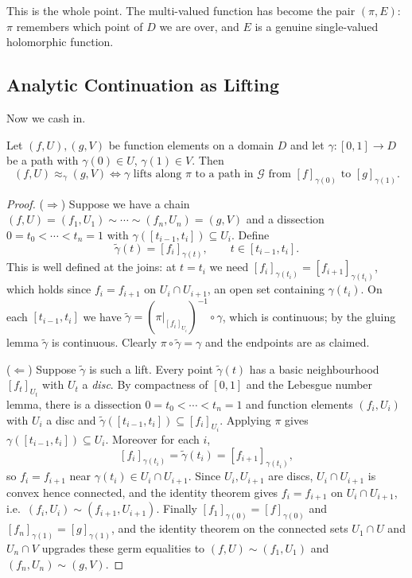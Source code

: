 \documentclass[a4paper]{scrartcl}
\begin{document}
This is the whole point. The multi-valued function has become the pair $(\pi, E)$: $\pi$
remembers which point of $D$ we are over, and $E$ is a genuine single-valued holomorphic
function.

\subsection{Analytic Continuation as Lifting}

Now we cash in.

\begin{theorem}\label{thm:contislifting}
	Let $(f,U), (g,V)$ be function elements on a domain $D$ and let $\gamma : [0,1] \to D$
	be a path with $\gamma(0) \in U$, $\gamma(1) \in V$. Then
	$$
	(f,U) \approx_\gamma (g,V) \iff \gamma \text{ lifts along } \pi \text{ to a path in } \mathcal{G} \text{ from } [f]_{\gamma(0)} \text{ to } [g]_{\gamma(1)}.
	$$
\end{theorem}

\begin{proof}
	($\Rightarrow$) Suppose we have a chain $(f,U) = (f_1,U_1) \sim \cdots \sim (f_n,U_n) = (g,V)$
	and a dissection $0 = t_0 < \cdots < t_n = 1$ with $\gamma([t_{i-1},t_i]) \subseteq U_i$.
	Define
	$$
	\tilde\gamma(t) = [f_i]_{\gamma(t)}, \qquad t \in [t_{i-1}, t_i].
	$$
	This is well defined at the joins: at $t = t_i$ we need $[f_i]_{\gamma(t_i)} =
	[f_{i+1}]_{\gamma(t_i)}$, which holds since $f_i = f_{i+1}$ on $U_i \cap U_{i+1}$, an
	open set containing $\gamma(t_i)$. On each $[t_{i-1},t_i]$ we have
	$\tilde\gamma = (\pi|_{[f_i]_{U_i}})^{-1}\circ\gamma$, which is continuous; by the
	gluing lemma $\tilde\gamma$ is continuous. Clearly $\pi \circ \tilde\gamma = \gamma$
	and the endpoints are as claimed.

	($\Leftarrow$) Suppose $\tilde\gamma$ is such a lift. Every point $\tilde\gamma(t)$ has
	a basic neighbourhood $[f_t]_{U_t}$ with $U_t$ a \emph{disc}. By compactness of $[0,1]$
	and the Lebesgue number lemma, there is a dissection
	$0 = t_0 < \cdots < t_n = 1$ and function elements $(f_i, U_i)$ with $U_i$ a disc and
	$\tilde\gamma([t_{i-1},t_i]) \subseteq [f_i]_{U_i}$. Applying $\pi$ gives
	$\gamma([t_{i-1},t_i]) \subseteq U_i$. Moreover for each $i$,
	$$
	[f_i]_{\gamma(t_i)} = \tilde\gamma(t_i) = [f_{i+1}]_{\gamma(t_i)},
	$$
	so $f_i = f_{i+1}$ near $\gamma(t_i) \in U_i \cap U_{i+1}$. Since $U_i, U_{i+1}$ are
	discs, $U_i \cap U_{i+1}$ is convex hence connected, and the identity theorem gives
	$f_i = f_{i+1}$ on $U_i \cap U_{i+1}$, i.e.\ $(f_i,U_i)\sim(f_{i+1},U_{i+1})$. Finally
	$[f_1]_{\gamma(0)} = [f]_{\gamma(0)}$ and $[f_n]_{\gamma(1)} = [g]_{\gamma(1)}$, and the
	identity theorem on the connected sets $U_1 \cap U$ and $U_n \cap V$ upgrades these germ
	equalities to $(f,U)\sim(f_1,U_1)$ and $(f_n,U_n)\sim(g,V)$.
\end{proof}
\end{document}
